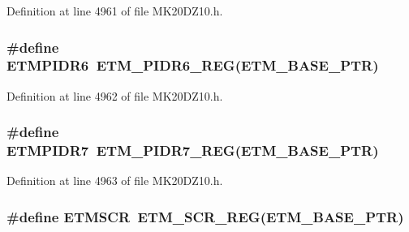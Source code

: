Definition at line 4961 of file M\+K20\+D\+Z10.\+h.

\subsubsection[{\texorpdfstring{E\+T\+M\+P\+I\+D\+R6}{ETMPIDR6}}]{\setlength{\rightskip}{0pt plus 5cm}\#define E\+T\+M\+P\+I\+D\+R6~{\bf E\+T\+M\+\_\+\+P\+I\+D\+R6\+\_\+\+R\+EG}({\bf E\+T\+M\+\_\+\+B\+A\+S\+E\+\_\+\+P\+TR})}\hypertarget{group___e_t_m___register___accessor___macros_gac184785d5de4b2fac8854d05c8f04474}{}\label{group___e_t_m___register___accessor___macros_gac184785d5de4b2fac8854d05c8f04474}


Definition at line 4962 of file M\+K20\+D\+Z10.\+h.

\subsubsection[{\texorpdfstring{E\+T\+M\+P\+I\+D\+R7}{ETMPIDR7}}]{\setlength{\rightskip}{0pt plus 5cm}\#define E\+T\+M\+P\+I\+D\+R7~{\bf E\+T\+M\+\_\+\+P\+I\+D\+R7\+\_\+\+R\+EG}({\bf E\+T\+M\+\_\+\+B\+A\+S\+E\+\_\+\+P\+TR})}\hypertarget{group___e_t_m___register___accessor___macros_ga965be8e308c2d8056e8d7a594f37c64c}{}\label{group___e_t_m___register___accessor___macros_ga965be8e308c2d8056e8d7a594f37c64c}


Definition at line 4963 of file M\+K20\+D\+Z10.\+h.

\subsubsection[{\texorpdfstring{E\+T\+M\+S\+CR}{ETMSCR}}]{\setlength{\rightskip}{0pt plus 5cm}\#define E\+T\+M\+S\+CR~{\bf E\+T\+M\+\_\+\+S\+C\+R\+\_\+\+R\+EG}({\bf E\+T\+M\+\_\+\+B\+A\+S\+E\+\_\+\+P\+TR})}\hypertarget{group___e_t_m___register___accessor___macros_ga35dc6d35cfc0a556d6f851664551abd3}{}\label{group___e_t_m___register___accessor___macros_ga35dc6d35cfc0a556d6f851664551abd3}


